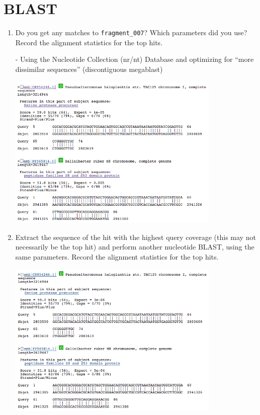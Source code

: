 \documentclass[a4paper,11pt]{article}
\begin{document}
\section{BLAST}

\begin{enumerate}
\item Do you get any matches to \texttt{fragment\_007}? Which parameters did you use? Record the alignment statistics for the top hits.

- Using the Nucleotide Collection (nr/nt) Database and optimizing for ``more dissimilar sequences''
(discontiguous megablast)

\vspace{0.5cm}
\begin{center}
\includegraphics[width=0.8\textwidth]{blastn1.png}
\end{center}
\vspace{0.5cm}

\item Extract the sequence of the hit with the highest query coverage (this may not necessarily be the top hit) and perform another nucleotide BLAST, using the same parameters. Record the alignment statistics for the top hits.

\vspace{0.5cm}
\begin{center}
\includegraphics[width=0.8\textwidth]{blastn2.png}
\end{center}
\vspace{0.5cm}


\end{enumerate}
\end{document}
